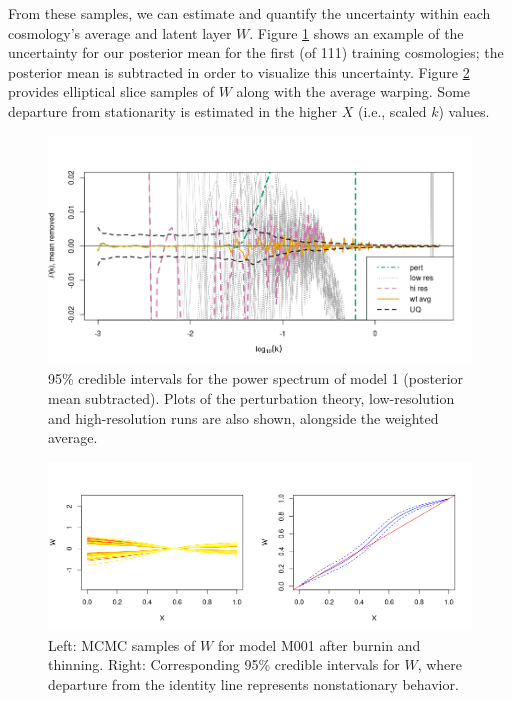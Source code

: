 \documentclass[11pt]{article}
\begin{document}
From these samples, we can estimate and quantify the uncertainty within each 
cosmology's average and latent layer $W$. Figure \ref{fig:plot_fit} shows an 
example of the uncertainty for our posterior mean for the first (of 111) training 
cosmologies; the posterior mean is subtracted in order to visualize this uncertainty. 
Figure \ref{fig:plot_warp} provides elliptical slice samples of $W$ along with the 
average warping. Some departure from stationarity is estimated in the higher $X$ 
(i.e., scaled $k$) values.

\begin{figure}[ht]
    \centering
    \includegraphics[width=6in]{plot_fit.png}
    \caption{95\% credible intervals for the power spectrum of model 1 (posterior mean 
             subtracted). Plots of the perturbation theory, low-resolution and high-resolution 
             runs are also shown, alongside the weighted average.}
    \label{fig:plot_fit}
\end{figure}

\begin{figure}[ht]
   \centering
   \includegraphics[width=6in]{plot_warp_M001.png}
   \caption{Left: MCMC samples of $W$ for model M001 after burnin and thinning. 
            Right: Corresponding 95\% credible intervals for $W$, where departure 
            from the identity line represents nonstationary behavior.}
   \label{fig:plot_warp}
\end{figure}
\end{document}
